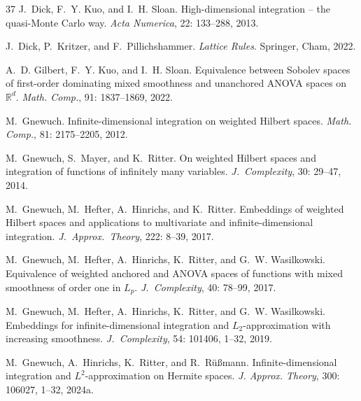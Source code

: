 \documentclass{article}
\newcommand{\R}  {{\mathbb R}}
\theoremstyle{plain}
\theoremstyle{definition}
\begin{document}
\begin{thebibliography}{37}
J.~Dick, F.~Y. Kuo, and I.~H. Sloan.
\newblock High-dimensional integration -- the quasi-{M}onte {C}arlo way.
\newblock \emph{Acta Numerica}, 22: 133--288, 2013.

J.~Dick, P.~Kritzer, and F.~Pillichshammer.
\newblock \emph{Lattice Rules}.
\newblock Springer, Cham, 2022.

A.~D. Gilbert, F.~Y. Kuo, and I.~H. Sloan.
\newblock Equivalence between {S}obolev spaces of first-order dominating mixed
  smoothness and unanchored {ANOVA} spaces on ${\R}^d$.
\newblock \emph{Math. Comp.}, 91: 1837--1869, 2022.

M.~Gnewuch.
\newblock Infinite-dimensional integration on weighted {H}ilbert spaces.
\newblock \emph{Math. Comp.}, 81: 2175--2205, 2012.

M.~Gnewuch, S.~Mayer, and K.~Ritter.
\newblock On weighted {H}ilbert spaces and integration of functions of
  infinitely many variables.
\newblock \emph{J.~Complexity}, 30: 29--47, 2014.

M.~Gnewuch, M.~Hefter, A.~Hinrichs, and K.~Ritter.
\newblock Embeddings of weighted {H}ilbert spaces and applications to
  multivariate and infinite-dimensional integration.
\newblock \emph{J.\ Approx.\ Theory}, 222: 8--39, 2017{}.

M.~Gnewuch, M.~Hefter, A.~Hinrichs, K.~Ritter, and G.~W. Wasilkowski.
\newblock Equivalence of weighted anchored and {ANOVA} spaces of functions with
  mixed smoothness of order one in ${L}_p$.
\newblock \emph{J.\ Complexity}, 40: 78--99, 2017{}.

M.~Gnewuch, M.~Hefter, A.~Hinrichs, K.~Ritter, and G.~W. Wasilkowski.
\newblock Embeddings for infinite-dimensional integration and
  ${L}_2$-approximation with increasing smoothness.
\newblock \emph{J.\ Complexity}, 54: 101406, 1--32, 2019.

M.~Gnewuch, A.~Hinrichs, K.~Ritter, and R.~R\"u{\ss}mann.
\newblock Infinite-dimensional integration and {$L^2$}-approximation on
  {H}ermite spaces.
\newblock \emph{J. Approx. Theory}, 300: 106027, 1--32, 2024a.


\end{thebibliography}
\end{document}
